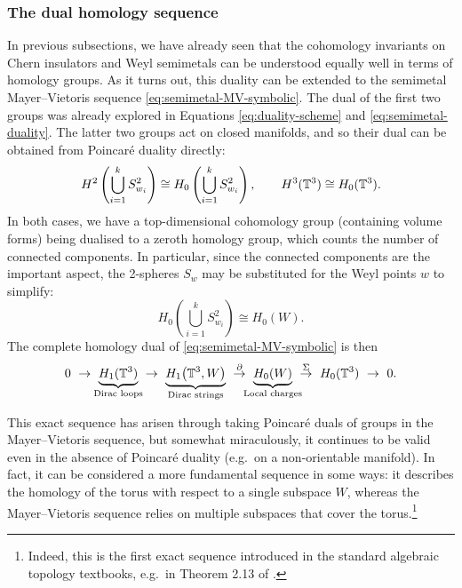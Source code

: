 \subsubsection{The dual homology sequence}

In previous subsections, we have already seen that the cohomology invariants on Chern insulators and Weyl semimetals can be understood equally well in terms of homology groups. As it turns out, this duality can be extended to the semimetal Mayer--Vietoris sequence \eqref{eq:semimetal-MV-symbolic}. The dual of the first two groups was already explored in Equations \eqref{eq:duality-scheme} and \eqref{eq:semimetal-duality}. The latter two groups act on closed manifolds, and so their dual can be obtained from Poincar\'e duality directly:
\begin{equation*}
	H^2\left(\bigcup_{i=1}^k S_{w_i}^2\right) \cong H_0\left(\bigcup_{i=1}^k S_{w_i}^2\right), \qquad
	H^3(\mathbb{T}^3) \cong H_0(\mathbb{T}^3).
\end{equation*}
In both cases, we have a top-dimensional cohomology group (containing volume forms) being dualised to a zeroth homology group, which counts the number of connected components. In particular, since the connected components are the important aspect, the 2-spheres $S_w$ may be substituted for the Weyl points $w$ to simplify:
\begin{equation*}
	H_0\left(\bigcup_{i=1}^k S_{w_i}^2\right) \cong H_0(W).
\end{equation*}
The complete homology dual of \eqref{eq:semimetal-MV-symbolic} is then
\begin{equation}\label{eq:semimetal-homology-sequence}
	0\ \to\ \underbrace{H_1(\T^3)}_{\mathclap{\text{Dirac loops}}}\ \to\ 
	\underbrace{H_1\big(\T^3, W\big)}_{\text{Dirac strings}}\ \overset{\partial}{\to}\ \underbrace{H_0(W)}_{\mathclap{\text{Local charges}}}\ \overset{\Sigma}{\to}\ H_0(\T^3)\ \to\ 0.
\end{equation}

This exact sequence has arisen through taking Poincaré duals of groups in the Mayer--Vietoris sequence, but somewhat miraculously, it continues to be valid even in the absence of Poincaré duality (e.g.\ on a non-orientable manifold). In fact, it can be considered a more fundamental sequence in some ways: it describes the homology of the torus with respect to a single subspace $W$, whereas the Mayer--Vietoris sequence relies on multiple subspaces that cover the torus.\footnote{
	Indeed, this is the first exact sequence introduced in the standard algebraic topology textbooks, e.g.\ in Theorem 2.13 of \cite{Hatcher_algebraic-topology}.}
	
